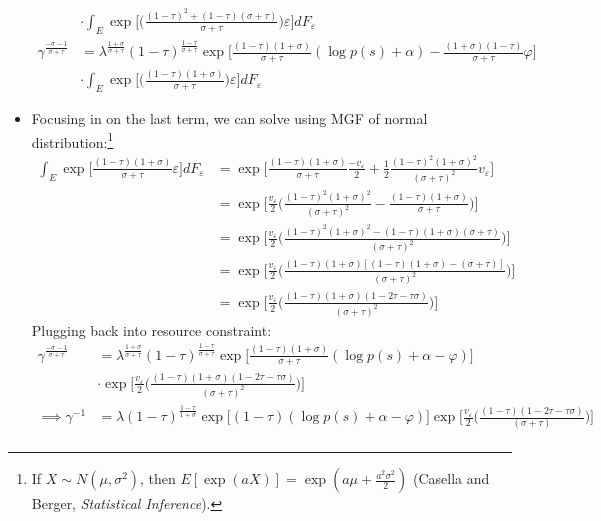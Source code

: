 \documentclass{article}
\begin{document}
\begin{itemize}
\begin{align*}
&\cdot \int_E  \exp  \Bigg[\Bigg(\frac{(1-\tau)^2 + (1 -\tau)(\sigma+\tau)}{\sigma+\tau} \Bigg) \varepsilon  \Bigg] dF_\varepsilon\\
\gamma^{\frac{-\sigma -1 }{\sigma+\tau}}
&= \lambda^{\frac{1+\sigma}{\sigma +\tau}}  (1-\tau)^{\frac{1 - \tau}{\sigma+\tau}}  \exp \Bigg[\frac{(1-\tau)(1+\sigma)}{\sigma +\tau}(\log p(s)+ \alpha)-\frac{(1+\sigma)(1-\tau)}{\sigma+\tau} \varphi \Bigg]\\
&\cdot \int_E  \exp  \Bigg[\Bigg(\frac{(1-\tau)(1+\sigma)}{\sigma+\tau} \Bigg) \varepsilon  \Bigg] dF_\varepsilon
\end{align*}
\item Focusing in on the last term, we can solve using MGF of normal distribution:\footnote{If $X \sim N(\mu, \sigma^2)$, then $E[\exp(aX)] = \exp(a\mu + \frac{a^2\sigma^2}{2})$ (Casella and Berger, \textit{Statistical Inference}).}
\begin{align*}
\int_E  \exp  \Bigg[\frac{(1-\tau)(1+\sigma)}{\sigma+\tau}  \varepsilon  \Bigg] dF_\varepsilon
&= \exp  \Bigg[ \frac{(1-\tau)(1+\sigma)}{\sigma+\tau}\frac{-v_\varepsilon}{2} +   \frac{1}{2}\frac{(1-\tau)^2(1+\sigma)^2}{(\sigma+\tau)^2} v_\varepsilon \Bigg]\\
&= \exp  \Bigg[\frac{v_\varepsilon}{2}\Bigg( \frac{(1-\tau)^2(1+\sigma)^2}{(\sigma+\tau)^2} - \frac{(1-\tau)(1+\sigma)}{\sigma+\tau}\Bigg) \Bigg]\\
&= \exp  \Bigg[\frac{v_\varepsilon}{2}\Bigg( \frac{(1-\tau)^2(1+\sigma)^2 - (1-\tau)(1+\sigma)(\sigma+\tau)}{(\sigma+\tau)^2}\Bigg) \Bigg]\\
&= \exp  \Bigg[\frac{v_\varepsilon}{2}\Bigg( \frac{(1-\tau)(1+\sigma)[(1-\tau)(1+\sigma) - (\sigma+\tau)]}{(\sigma+\tau)^2}\Bigg) \Bigg]\\
&= \exp  \Bigg[\frac{v_\varepsilon}{2}\Bigg( \frac{(1-\tau)(1+\sigma)(1-2\tau-\tau\sigma)}{(\sigma+\tau)^2}\Bigg) \Bigg]
\end{align*}
Plugging back into resource constraint:
\begin{align*}
\gamma^{\frac{-\sigma -1 }{\sigma+\tau}}
&= \lambda^{\frac{1+\sigma}{\sigma +\tau}}  (1-\tau)^{\frac{1 - \tau}{\sigma+\tau}}  \exp \Bigg[\frac{(1-\tau)(1+\sigma)}{\sigma +\tau}(\log p(s)+ \alpha - \varphi) \Bigg]\\
&\cdot \exp  \Bigg[\frac{v_\varepsilon}{2}\Bigg( \frac{(1-\tau)(1+\sigma)(1-2\tau-\tau\sigma)}{(\sigma+\tau)^2}\Bigg) \Bigg]\\
\implies
\gamma^{-1}
&= \lambda (1-\tau)^{\frac{1 - \tau}{1+\sigma}}  \exp \Bigg[(1-\tau)(\log p(s)+ \alpha -\varphi) \Bigg] \exp  \Bigg[\frac{v_\varepsilon}{2}\Bigg( \frac{(1-\tau)(1-2\tau-\tau\sigma)}{(\sigma+\tau)}\Bigg) \Bigg]\\

\end{align*}
\end{itemize}
\end{document}
